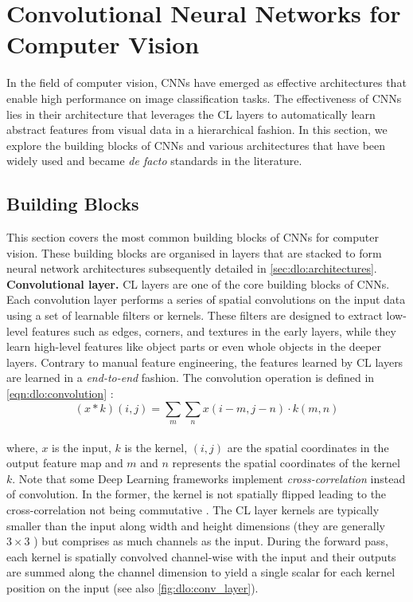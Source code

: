 \section{Convolutional Neural Networks for Computer Vision}\label{sec:dlo:cnn}

In the field of computer vision, \acp{CNN} have emerged as effective
architectures that enable high performance on image classification tasks. The
effectiveness of \acp{CNN} lies in their architecture that leverages the \ac{CL}
layers to automatically learn abstract features from visual data in a
hierarchical fashion. In this section, we explore the building blocks of
\acp{CNN} and various architectures that have been widely used and became
\emph{de facto} standards in the literature.

\subsection{Building Blocks}

This section covers the most common building blocks of \acp{CNN} for computer
vision. These building blocks are organised in layers that are stacked to form
neural network architectures subsequently detailed in
\cref{sec:dlo:architectures}.\\

\noindent\textbf{Convolutional layer.} \ac{CL} layers are one of the core
building blocks of \acp{CNN}. Each convolution layer performs a series of
spatial convolutions on the input data using a set of learnable filters or
kernels. These filters are designed to extract low-level features such as edges,
corners, and textures in the early layers, while they learn high-level features
like object parts or even whole objects in the deeper layers. Contrary to manual
feature engineering, the features learned by \ac{CL} layers are learned in a
\emph{end-to-end} fashion. The convolution operation is defined in
\cref{eqn:dlo:convolution} :\\

\begin{equation}
  \label{eqn:dlo:convolution}
  (x * k)(i,j) = \sum_{m} \sum_{n} x(i -m, j -n) \cdot k(m, n)
\end{equation}\\

\noindent where, $x$ is the input, $k$ is the kernel, $(i,j)$ are the spatial
coordinates in the output feature map and $m$ and $n$ represents the spatial
coordinates of the kernel $k$. Note that some Deep Learning frameworks implement
\emph{cross-correlation} instead of convolution. In the former, the kernel is
not spatially flipped leading to the cross-correlation not being commutative
\cite{goodfellow2016deep}. The \ac{CL} layer kernels are typically smaller than
the input along width and height dimensions (they are generally $3\times 3$
\cite{DBLP:conf/cvpr/HeZRS16}) but comprises as much channels as the input.
During the forward pass, each kernel is spatially convolved channel-wise with
the input and their outputs are summed along the channel dimension to yield a
single scalar for each kernel position on the input (see also
\cref{fig:dlo:conv_layer}).\\

